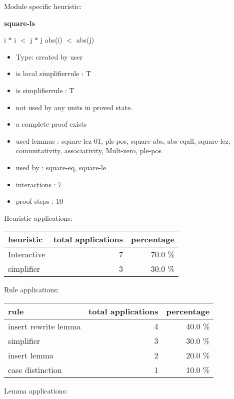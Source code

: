 \documentclass[a4paper]{article}
\begin{document}
Module specific heuristic:

\pagebreak

{\LARGE\bf square-ls}\label{lemma-square-ls}

\medskip

 \Fol i $*$ i $<$ j $*$ j \Equiv abs(i) $<$ abs(j)

\begin{itemize}

\item Type: created by user

\item is local simplifierrule : T
\item is simplifierrule : T
\item not used by any units in proved state.
\item       a complete proof exists
\item       used lemmas  : square-lez-01, pls-pos, square-abs, abs-eqall, square-lez, commutativity, associativity, Mult-zero, ple-pos
\item       used by      : square-eq, square-le
\item       interactions : 7
\item       proof steps  : 10
\end{itemize}

\medskip


Heuristic applications:

\begin{supertabular}{l|r|r}
heuristic	& total applications & percentage \\ \hline
Interactive & 7 & 70.0 \% \\
simplifier & 3 & 30.0 \% \\

\end{supertabular}

Rule applications:

\begin{supertabular}{l|r|r}
rule	        & total applications & percentage \\ \hline
insert rewrite lemma & 4 & 40.0 \% \\
simplifier & 3 & 30.0 \% \\
insert lemma & 2 & 20.0 \% \\
case distinction & 1 & 10.0 \% \\

\end{supertabular}

Lemma applications:
\end{document}

